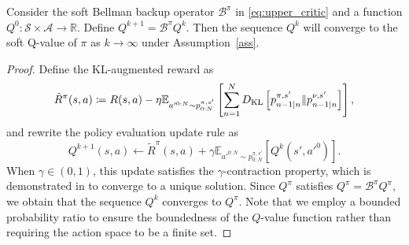 \begin{lemma}
\label{lemma:soft_policy_eval}
Consider the soft Bellman backup operator $\mathcal{B}^\pi$ in \eqref{eq:upper_critic} and a function $Q^0:\mathcal{S}\times\mathcal{A}\to\mathbb{R}$. Define $Q^{k+1}=\mathcal{B}^\pi Q^{k}$. Then the sequence $Q^k$ will converge to the soft Q-value of $\pi$ as $k\to\infty$ under Assumption~\ref{ass}.

\end{lemma}
\begin{proof}
    Define the KL-augmented reward as 
    $$
    \tilde{R}^\pi(s, a)\coloneqq R(s, a) - \eta\mathbb{E}_{a'^{0:N}\sim p^{\pi,s'}_{0:N}}\left[\sum_{n=1}^ND_{\rm KL}\left[p_{n-1|n}^{\pi,s'}\|p_{n-1|n}^{\nu,s'}\right]\right],
    $$
    and rewrite the policy evaluation update rule as
    $$
    Q^{k+1}(s, a)\leftarrow \tilde{R}^{\pi}(s, a)+\gamma \mathbb{E}_{a'^{0:N}\sim p^{\pi,s'}_{0:N}}\left[Q^k(s', a'^0)\right].
    $$
    When $\gamma\in(0, 1)$, this update satisfies the $\gamma$-contraction property, which is demonstrated in \citet{sac} to converge to a unique solution. Since $Q^\pi$ satisfies $Q^\pi=\mathcal{B}^\pi Q^\pi$, we obtain that the sequence $Q^k$ converges to $Q^\pi$. Note that we employ a bounded probability ratio to ensure the boundedness of the $Q$-value function rather than requiring the action space to be a finite set.
\end{proof}

